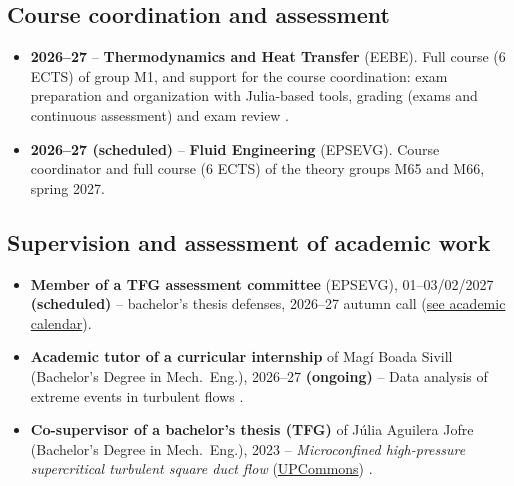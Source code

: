 \documentclass[11pt]{article}
\newcommand{\NEW}[1]{\iffinal #1\else{\color{red}#1}\fi} %
\begin{document}
\subsection{Course coordination and assessment}
\begin{itemize}
  \item \textbf{2026--27} -- \textbf{Thermodynamics and Heat Transfer} (EEBE). Full course
  (6 ECTS) of group M1, and support \NEW{for the course} coordination: exam preparation and
  organization with Julia-based tools, grading (exams and continuous assessment) and exam
  review
  .
  \item \textbf{2026--27 (scheduled)} -- \textbf{Fluid Engineering} (EPSEVG). Course
  coordinator and full course (6 ECTS) of the theory groups M65 and M66, spring 2027.
\end{itemize}

\subsection{Supervision and assessment of academic work}
\begin{itemize}
  \item \textbf{Member of a TFG assessment committee} (EPSEVG), 01--03/02/2027
  \textbf{(scheduled)} -- bachelor's thesis defenses, 2026--27 autumn call
  (\href{https://drive.google.com/file/d/1TGufsft81vD3qv27ZWpKPmW_KSVtG-hR/view}{see academic calendar}).
  \item \textbf{Academic tutor of a curricular internship} of Mag\'i Boada Sivill
  (Bachelor's Degree in Mech.\ Eng.), 2026--27 \textbf{(ongoing)} -- Data analysis of
  extreme events in turbulent flows .
  \item \textbf{Co-supervisor of a bachelor's thesis (TFG)} of J\'ulia Aguilera Jofre
  (Bachelor's Degree in Mech.\ Eng.), 2023 -- \emph{Microconfined high-pressure
  supercritical turbulent square duct flow}
  (\href{https://hdl.handle.net/2117/395741}{UPCommons})
  .
\end{itemize}
\end{document}
